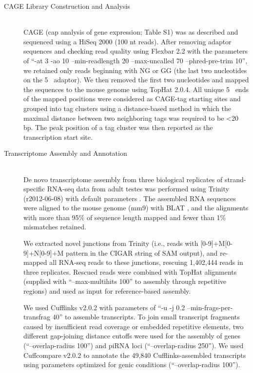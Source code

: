 \begin{description}
    \item[CAGE Library Construction and Analysis] \hfill \\
    CAGE (cap analysis of gene expression; Table S1) was as described \citep{Yang2011} and sequenced using a HiSeq 2000 (100 nt reads). After removing adaptor sequences and checking read quality using Flexbar 2.2 with the parameters of “-at 3 -ao 10 --min-readlength 20 --max-uncalled 70 --phred-pre-trim 10”, we retained only reads beginning with NG or GG (the last two nucleotides on the 5\textprime~ adaptor). We then removed the first two nucleotides and mapped the sequences to the mouse genome using TopHat 2.0.4. All unique 5\textprime~ ends of the mapped positions were considered as CAGE-tag starting sites and grouped into tag clusters using a distance-based method in which the maximal distance between two neighboring tags was required to be <20 bp. The peak position of a tag cluster was then reported as the transcription start site.

    \item[Transcriptome Assembly and Annotation] \hfill \\
    De novo transcriptome assembly from three biological replicates of strand-specific RNA-seq data from adult testes was performed using Trinity (r2012-06-08) with default parameters \citep{Grabherr2011}. The assembled RNA sequences were aligned to the mouse genome (mm9) with BLAT \citep{Kent2002}, and the alignments with more than 95\% of sequence length mapped and fewer than 1\% mismatches retained.

    We extracted novel junctions from Trinity (i.e., reads with [0-9]+M[0-9]+N[0-9]+M pattern in the CIGAR string of SAM output), and re-mapped all RNA-seq reads to these junctions, rescuing 1,402,444 reads in three replicates. Rescued reads were combined with TopHat alignments (supplied with ``–max-multihits 100'' to assembly through repetitive regions) and used as input for reference-based assembly.

    We used Cufflinks v2.0.2 \citep{Trapnell2010} with parameters of “-u -j 0.2 --min-frags-per-transfrag 40” to assemble transcripts. To join small transcript fragments caused by insufficient read coverage or embedded repetitive elements, two different gap-joining distance cutoffs were used for the assembly of genes (“--overlap-radius 100”) and piRNA loci (“--overlap-radius 250”). We used Cuffcompare v2.0.2 \citep{Trapnell2010} to annotate the 49,840 Cufflinks-assembled transcripts using parameters optimized for genic conditions (“--overlap-radius 100”).


\end{description}
